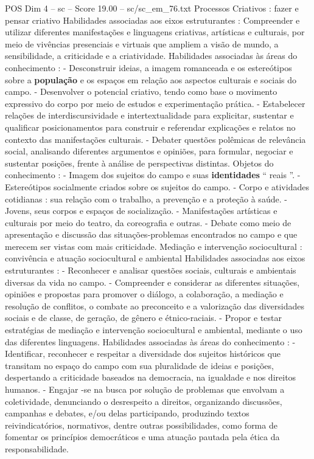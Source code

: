 \begin{textsample}{POS Dim 4 – sc – Score 19.00 – sc/sc\_em\_76.txt}
Processos Criativos : fazer e pensar criativo Habilidades associadas aos eixos estruturantes : Compreender e utilizar diferentes manifestações e linguagens criativas, artísticas e culturais, por meio de vivências presenciais e virtuais que ampliem a visão de mundo, a sensibilidade, a criticidade e a criatividade.
Habilidades associadas às áreas do conhecimento : - Desconstruir ideias, a imagem romanceada e os estereótipos sobre a \textbf{população} e os espaços em relação aos aspectos culturais e sociais do campo. - Desenvolver o potencial criativo, tendo como base o movimento expressivo do corpo por meio de estudos e experimentação prática. - Estabelecer relações de interdiscursividade e intertextualidade para explicitar, sustentar e qualificar posicionamentos para construir e referendar explicações e relatos no contexto das manifestações culturais. - Debater questões polêmicas de relevância social, analisando diferentes argumentos e opiniões, para formular, negociar e sustentar posições, frente à análise de perspectivas distintas.
Objetos do conhecimento : - Imagem dos sujeitos do campo e suas \textbf{identidades} “ reais ”. - Estereótipos socialmente criados sobre os sujeitos do campo. - Corpo e atividades cotidianas : sua relação com o trabalho, a prevenção e a proteção à saúde. - Jovens, seus corpos e espaços de socialização. - Manifestações artísticas e culturais por meio do teatro, da coreografia e outras. - Debate como meio de apresentação e discussão das situações-problemas encontrados no campo e que merecem ser vistas com mais criticidade.
Mediação e intervenção sociocultural : convivência e atuação sociocultural e ambiental Habilidades associadas aos eixos estruturantes : - Reconhecer e analisar questões sociais, culturais e ambientais diversas da vida no campo. - Compreender e considerar as diferentes situações, opiniões e propostas para promover o diálogo, a colaboração, a mediação e resolução de conflitos, o combate ao preconceito e a valorização das diversidades sociais e de classe, de geração, de gênero e étnico-raciais. - Propor e testar estratégias de mediação e intervenção sociocultural e ambiental, mediante o uso das diferentes linguagens.
Habilidades associadas às áreas do conhecimento : - Identificar, reconhecer e respeitar a diversidade dos sujeitos históricos que transitam no espaço do campo com sua pluralidade de ideias e posições, despertando a criticidade baseados na democracia, na igualdade e nos direitos humanos. - Engajar -se na busca por solução de problemas que envolvam a coletividade, denunciando o desrespeito a direitos, organizando discussões, campanhas e debates, e/ou delas participando, produzindo textos reivindicatórios, normativos, dentre outras possibilidades, como forma de fomentar os princípios democráticos e uma atuação pautada pela ética da responsabilidade.

\end{textsample}
